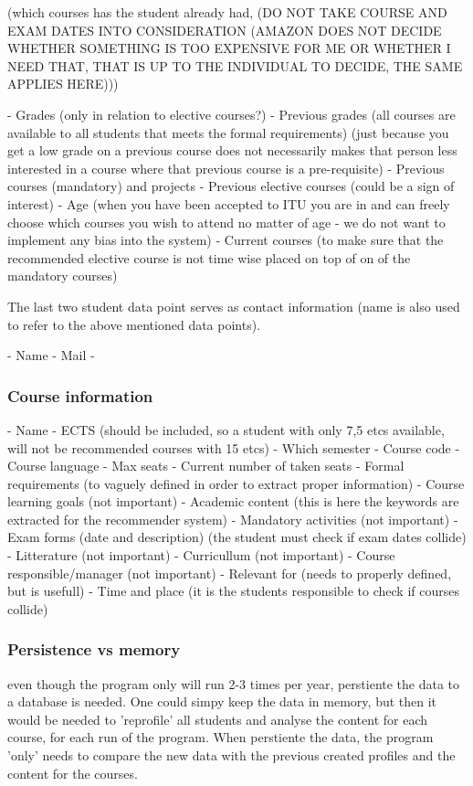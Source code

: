 (which courses has the student already had, (DO NOT TAKE COURSE AND EXAM DATES INTO CONSIDERATION (AMAZON DOES NOT DECIDE WHETHER SOMETHING IS TOO EXPENSIVE FOR ME OR WHETHER I NEED THAT, THAT IS UP TO THE INDIVIDUAL TO DECIDE, THE SAME APPLIES HERE)))

- Grades (only in relation to elective courses?)
- Previous grades (all courses are available to all students that meets the formal requirements) (just because you get a low grade on a previous course does not necessarily makes that person less interested in a course where that previous course is a pre-requisite)
- Previous courses (mandatory) and projects
- Previous elective courses (could be a sign of interest)
- Age (when you have been accepted to ITU you are in and can freely choose which courses you wish to attend no matter of age - we do not want to implement any bias into the system)
- Current courses (to make sure that the recommended elective course is not time wise placed on top of on of the mandatory courses)

The last two student data point serves as contact information (name is also used to refer to the above mentioned data points).
 
- Name
- Mail
- 

\subsubsection{Course information}

- Name
- ECTS (should be included, so a student with only 7,5 etcs available, will not be recommended courses with 15 etcs)
- Which semester
- Course code
- Course language
- Max seats
- Current number of taken seats
- Formal requirements (to vaguely defined in order to extract proper information)
- Course learning goals (not important)
- Academic content (this is here the keywords are extracted for the recommender system)
- Mandatory activities (not important)
- Exam forms (date and description) (the student must check if exam dates collide)
- Litterature (not important)
- Curricullum (not important)
- Course responsible/manager (not important)
- Relevant for (needs to properly defined, but is usefull)
- Time and place (it is the students responsible to check if courses collide)


\subsubsection{Persistence vs memory}
even though the program only will run 2-3 times per year, perstiente the data to a database is needed. One could simpy keep the data in memory, but then it would be needed to 'reprofile' all students and analyse the content for each course, for each run of the program. When perstiente the data, the program 'only' needs to compare the new data with the previous created profiles and the content for the courses.

